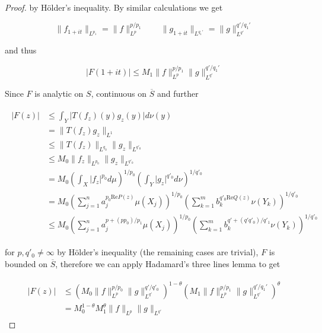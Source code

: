 \begin{proof}
				by H\"older's inequality. By similar calculations we get 
				
				\begin{equation}
					\|f_{1 + it}\|_{L^{p_1}} = \|f\|_{L^p}^{p/p_1} \qquad \|g_{1 + it}\|_{L^{q_1'}} = \|g\|_{L^{q'}}^{q'/q_1'}
				\end{equation}

				and thus 
				
				\begin{equation}
					\vert F(1 + it)\vert \leqslant M_1 \|f\|_{L^p}^{p/p_1}\|g\|_{L^{q'}}^{q'/q_1'}
				\end{equation}	

					Since $F$ is analytic on $S$, continuous on $\overline{S}$ and further 
		
		\begin{gather}
			\begin{aligned}
				\vert F(z)\vert &\leqslant \int_Y\vert T(f_z)(y)g_z(y)\vert d\nu(y)\\
				&= \|T(f_z)g_z\|_{L^1}\\
				&\leqslant \|T(f_z)\|_{L^{q_0}} \|g_z\|_{L^{q'_0}}\\
				&\leqslant M_0 \|f_z\|_{L^{p_0}} \|g_z\|_{L^{q'_0}}\\
				&= M_0 \left(\int_X \vert f_z \vert^{p_0} d\mu\right)^{1/p_0} \left(\int_Y \vert g_z \vert^{q'_0} d\nu\right)^{1/q'_0}\\
				&= M_0 \left( \sum\limits_{j = 1}^n a_j^{p_0\mathrm{Re}P(z)}\mu(X_j) \right)^{1/p_0} \left( \sum\limits_{k = 1}^m b_k^{q'_0\mathrm{Re}Q(z)} \nu(Y_k) \right)^{1/q'_0}\\
				&\leqslant M_0 \left( \sum\limits_{j = 1}^n a_j^{p + (pp_0)/p_1}\mu(X_j) \right)^{1/p_0} \left( \sum\limits_{k = 1}^m b_k^{q' + (q'q'_0)/q'_1} \nu(Y_k) \right)^{1/q'_0}
			\end{aligned}
		\end{gather}
		
		
		for $p,q'_0 \neq \infty$ by H\"older's inequality (the remaining cases are trivial), $F$ is bounded on $\overline{S}$, therefore we can apply Hadamard's three lines lemma to get

		\begin{gather}
			\begin{aligned}
				\vert F(z) \vert &\leqslant \left( M_0  \|f\|_{L^p}^{p/p_0} \|g\|_{L^{q'}}^{q'/q'_0} \right)^{1 - \theta}\left(  M_1 \|f\|_{L^p}^{p/p_1}\|g\|_{L^{q'}}^{q'/q_1'} \right)^\theta\\
			&= M_0^{1 - \theta}M_1^\theta \|f\|_{L^p}\|g\|_{L^{q'}}
			\label{est:F}
		\end{aligned}
		\end{gather}


\end{proof}
